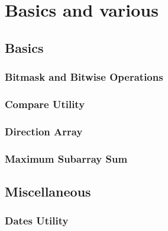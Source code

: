 \chapter{Basics and various}





\section{Basics}

\subsection{Bitmask and Bitwise Operations}

\subsection{Compare Utility}

\subsection{Direction Array}

\subsection{Maximum Subarray Sum}

\section{Miscellaneous}

\subsection{Dates Utility}

